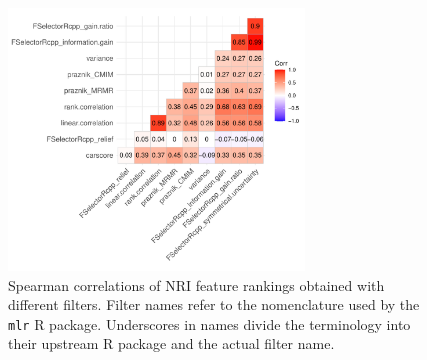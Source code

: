 \documentclass[remotesensing,article,accept,moreauthors,pdftex]{Definitions/mdpi}
\begin{document}
\begin{paracol}{2}
{} %
\appendixstart
\appendix
\section{}\label{appendixA}
\subsection{}

\vspace{-12pt}
\begin{figure} [H]
		\includegraphics[width=0.7\textwidth] {correlation-filter-nri-1.pdf}
		\caption{Spearman correlations of NRI feature rankings obtained with different filters. Filter names refer to the nomenclature used by the \texttt{mlr} R package. Underscores in names divide the terminology into their upstream R package and the actual filter name.}\label{fig:correlation-filters}
\end{figure}



\end{paracol}
\end{document}
